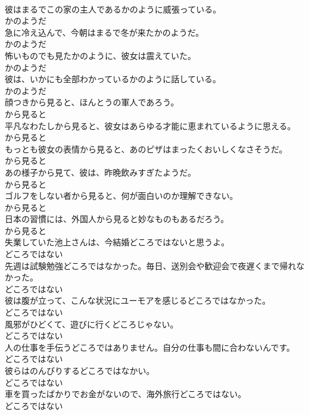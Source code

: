 \documentclass[8pt]{extreport}
\begin{document}
\begin{CJK}{UTF8}{min}
\\	彼はまるでこの家の主人であるかのように威張っている。	
\\	かのようだ
\\	急に冷え込んで、今朝はまるで冬が来たかのようだ。	
\\	かのようだ
\\	怖いものでも見たかのように、彼女は震えていた。	
\\	かのようだ
\\	彼は、いかにも全部わかっているかのように話している。	
\\	かのようだ
\\	顔つきから見ると、ほんとうの軍人であろう。	
\\	から見ると
\\	平凡なわたしから見ると、彼女はあらゆる才能に恵まれているように思える。	
\\	から見ると
\\	もっとも彼女の表情から見ると、あのピザはまったくおいしくなさそうだ。	
\\	から見ると
\\	あの様子から見て、彼は、昨晩飲みすぎたようだ。	
\\	から見ると
\\	ゴルフをしない者から見ると、何が面白いのか理解できない。	
\\	から見ると
\\	日本の習慣には、外国人から見ると妙なものもあるだろう。	
\\	から見ると
\\	失業していた池上さんは、今結婚どころではないと思うよ。	
\\	どころではない
\\	先週は試験勉強どころではなかった。毎日、送別会や歓迎会で夜遅くまで帰れなかった。	
\\	どころではない
\\	彼は腹が立って、こんな状況にユーモアを感じるどころではなかった。	
\\	どころではない
\\	風邪がひどくて、遊びに行くどころじゃない。	
\\	どころではない
\\	人の仕事を手伝うどころではありません。自分の仕事も間に合わないんです。	
\\	どころではない
\\	彼らはのんびりするどころではなかい。	
\\	どころではない
\\	車を買ったばかりでお金がないので、海外旅行どころではない。	
\\	どころではない

\end{CJK}
\end{document}
